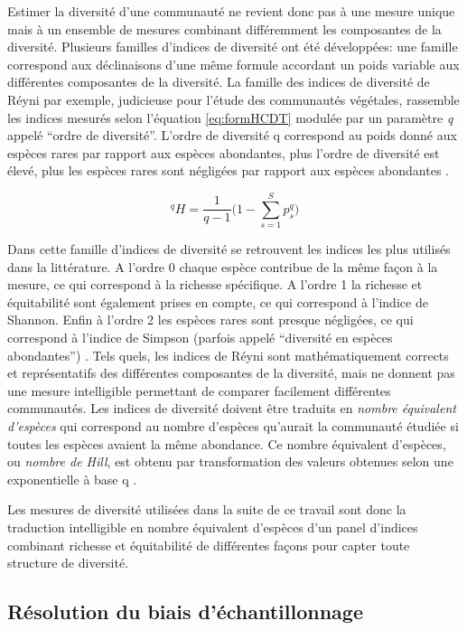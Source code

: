 \documentclass[
  11pt,
  french,
  A4paper,
  extrafontsizes,onecolumn,openright
  ]{memoir}
\begin{document}
Estimer la diversité d'une communauté ne revient donc pas à une mesure
unique mais à un ensemble de mesures combinant différemment les
composantes de la diversité. Plusieurs familles d'indices de diversité
ont été développées: une famille correspond aux déclinaisons d'une même
formule accordant un poids variable aux différentes composantes de la
diversité. La famille des indices de diversité de Réyni par exemple,
judicieuse pour l'étude des communautés végétales, rassemble les indices
mesurés selon l'équation \eqref{eq:formHCDT} modulée par un paramètre
\emph{q} appelé ``ordre de diversité''. L'ordre de diversité q
correspond au poids donné aux espèces rares par rapport aux espèces
abondantes, plus l'ordre de diversité est élevé, plus les espèces rares
sont négligées par rapport aux espèces abondantes \autocite{Mendes2008}.

\begin{equation}
{^{q}H=\frac{1}{q-1}\Bigg(1-\displaystyle\sum_{s=1}^{S}p^q_s\Bigg) }
\label{eq:formHCDT}
\end{equation}

Dans cette famille d'indices de diversité se retrouvent les indices les
plus utilisés dans la littérature. A l'ordre 0 chaque espèce contribue
de la même façon à la mesure, ce qui correspond à la richesse
spécifique. A l'ordre 1 la richesse et équitabilité sont également
prises en compte, ce qui correspond à l'indice de Shannon. Enfin à
l'ordre 2 les espèces rares sont presque négligées, ce qui correspond à
l'indice de Simpson (parfois appelé ``diversité en espèces abondantes'')
\autocites{Shannon1948}{Simpson1949}{Patil1982}{Tothmeresz1995}. Tels
quels, les indices de Réyni sont mathématiquement corrects et
représentatifs des différentes composantes de la diversité, mais ne
donnent pas une mesure intelligible permettant de comparer facilement
différentes communautés. Les indices de diversité doivent être traduits
en \emph{nombre équivalent d'espèces} qui correspond au nombre d'espèces
qu'aurait la communauté étudiée si toutes les espèces avaient la même
abondance. Ce nombre équivalent d'espèces, ou \emph{nombre de Hill}, est
obtenu par transformation des valeurs obtenues selon une exponentielle à
base q \autocite{Hill1973}.

Les mesures de diversité utilisées dans la suite de ce travail sont donc
la traduction intelligible en nombre équivalent d'espèces d'un panel
d'indices combinant richesse et équitabilité de différentes façons pour
capter toute structure de diversité.

\subsection{Résolution du biais
d'échantillonnage}\label{resolution-du-biais-dechantillonnage}
\end{document}
